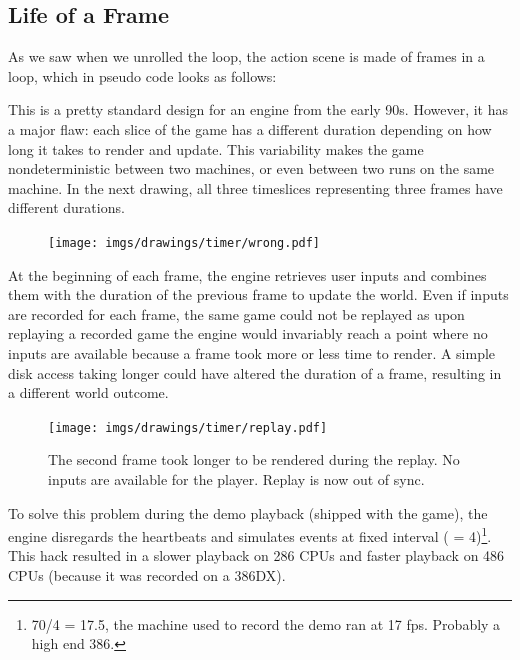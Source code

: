 \subsection{Life of a Frame}
As we saw when we unrolled the loop, the action scene is made of frames in a loop, which in pseudo code looks as follows:\\
\par
\begin{minipage}{\textwidth}
 
 \end{minipage}
\par
This is a pretty standard design for an engine from the early 90s. However, it has a major flaw: each slice of the game has a different duration depending on how long it takes to render and update. This variability makes the game nondeterministic between two machines, or even between two runs on the same machine. In the next drawing, all three timeslices representing three frames have different durations.\\
\begin{figure}[H]
\centering
 \texttt{[image: imgs/drawings/timer/wrong.pdf]}
 
 \end{figure}
  At the beginning of each frame, the engine retrieves user inputs and combines them with the duration of the previous frame to update the world. Even if inputs are recorded for each frame, the same game could not be replayed as upon replaying a recorded game the engine would invariably reach a point where no inputs are available because a frame took more or less time to render. A simple disk access taking longer could have altered the duration of a frame, resulting in a different world outcome.\\
 \begin{figure}[H]
\centering
 \texttt{[image: imgs/drawings/timer/replay.pdf]}
 \caption{The second frame took longer to be rendered during the replay. No inputs are available for the player. Replay is now out of sync.}
 \end{figure}
\par
To solve this problem during the demo playback (shipped with the game), the engine disregards the heartbeats and simulates events at fixed interval ( = 4)\footnote{70/4 = 17.5, the machine used to record the demo ran at 17 fps. Probably a high end 386.}. This hack resulted in a slower playback on 286 CPUs and faster playback on 486 CPUs (because it was recorded on a 386DX).\\
